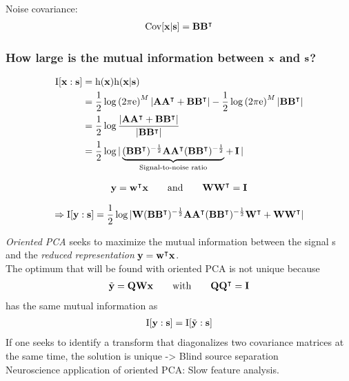 Noise covariance:
\begin{align*}
	\mathrm{Cov}[\mathbf{x} | \mathbf{s}] = \mathbf{B B^\intercal}
\end{align*}

\subsubsection{How large is the mutual information between $\mathbf{x}$ and $\mathbf{s}$?}

\begin{align}
\begin{split}
	\mathrm{I}[\mathbf{x}:\mathbf{s}] &= \mathrm{h}(\mathbf{x}) \mathrm{h}(\mathbf{x} | \mathbf{s}) \\
					&= \frac{1}{2} \log \left(2 \pi \mathrm{e} \right)^M | \mathbf{A A^\intercal} + \mathbf{B B^\intercal} |
					   -\frac{1}{2} \log \left(2 \pi \mathrm{e} \right)^M | \mathbf{B B^\intercal} | \\
					&= \frac{1}{2} \log \frac{| \mathbf{A A^\intercal} + \mathbf{B B^\intercal} |}{| \mathbf{B B^\intercal} |} \\
					&= \frac{1}{2} \log |\underbrace{(\mathbf{B B^\intercal})^{-\frac{1}{2}} \mathbf{A A^\intercal} (\mathbf{B B^\intercal})^{-\frac{1}{2}}}_{\text{Signal-to-noise ratio}} + \operatorname{\mathbf{I}}| \\					
\end{split}
\end{align}

\begin{align}
	\mathbf{y} = \mathbf{w^\intercal x} \qquad \text{and} \qquad \mathbf{W W}^\intercal = \operatorname{\mathbf{I}}
\end{align}

\begin{align}
	\Rightarrow \mathrm{I}[\mathbf{y}:\mathbf{s}]
	   = \frac{1}{2} \log |\mathbf{W} (\mathbf{B B^\intercal})^{-\frac{1}{2}} \mathbf{A A^\intercal} (\mathbf{B B^\intercal})^{-\frac{1}{2}} \mathbf{W}^\intercal + \mathbf{W W}^\intercal|
\end{align}

\emph{Oriented PCA} seeks to maximize the mutual information between the signal s and 
the \emph{reduced representation} $\mathbf{y} = \mathbf{w^\intercal x}$. \\

The optimum that will be found with oriented PCA is not unique because
\begin{align}
	\tilde{\mathbf{y}} = \mathbf{Q W x} \qquad \text{with} \qquad \mathbf{Q Q^\intercal} = \operatorname{\mathbf{I}}
\end{align}
has the same mutual information as 
\begin{align*}
	\mathrm{I}[\mathbf{y}:\mathbf{s}] = \mathrm{I}[\tilde{\mathbf{y}}:\mathbf{s}]
\end{align*}
If one seeks to identify a transform that diagonalizes two covariance matrices at the same time,
the solution is unique -> Blind source separation \cite{Tong1991,Molgedey1994}\\

Neuroscience application of oriented PCA: Slow feature analysis.